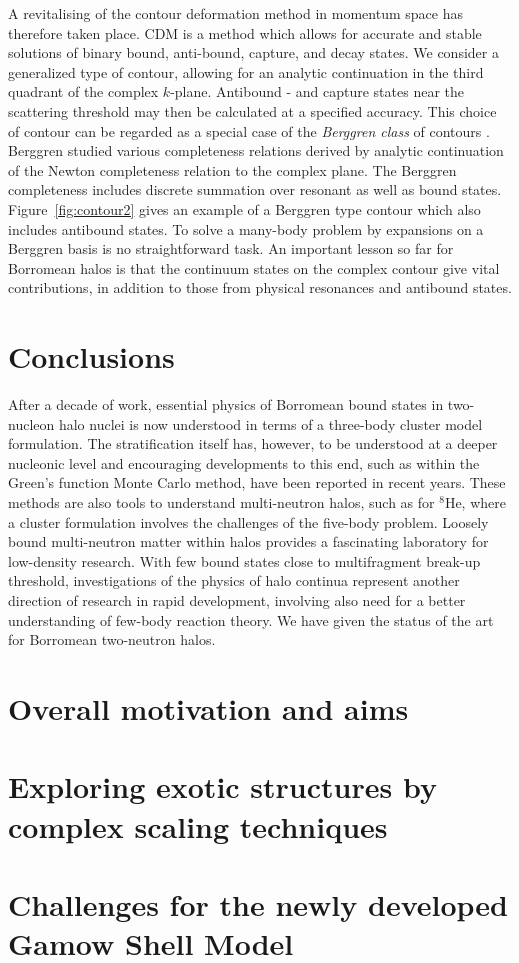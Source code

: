 A revitalising of the contour deformation method in momentum space
has therefore taken place. CDM is a method which allows for
accurate and stable solutions of binary bound, anti-bound,
capture, and decay states. We consider a generalized type of
contour, allowing for an analytic continuation in the third
quadrant of the complex $k$-plane. Antibound - and capture states
near the scattering threshold may then be calculated at a
specified accuracy.  This choice of contour can be regarded as a
special case of the \emph{Berggren class} of contours
\cite{berggren}. Berggren studied various completeness relations
derived by analytic continuation of the Newton completeness
relation to the complex plane. The Berggren completeness includes
discrete summation over resonant as well as bound states.
Figure~\ref{fig:contour2} gives an example of a Berggren type
contour which also includes antibound states. To solve a many-body
problem by expansions on a Berggren basis is no straightforward
task. An important lesson so far for Borromean halos is that the
continuum states on the complex contour give vital contributions,
in addition to those from physical resonances and antibound
states.

\section{Conclusions}

After a decade of work, essential physics of Borromean bound
states in two-nucleon halo nuclei is now understood in terms of a
three-body cluster model formulation. The stratification itself
has, however, to be understood at a deeper nucleonic level and
encouraging developments to this end, such as within the Green's
function Monte Carlo method, have been reported in recent years.
These methods are also tools to understand multi-neutron halos,
such as for $^8$He, where a cluster formulation involves the
challenges of the five-body problem. Loosely bound multi-neutron
matter within halos provides a fascinating laboratory for
low-density research. With few bound states close to multifragment
break-up threshold, investigations of the physics of halo continua
represent another direction of research in rapid development,
involving also need for a better understanding of few-body
reaction theory. We have given the status of the art for Borromean
two-neutron halos.

\section{Overall motivation and aims}
\label{sec:motivation}

\section{Exploring exotic structures by complex scaling techniques}
\label{sec:exploring_exotic}

\section{Challenges for the newly developed Gamow Shell Model}
\label{sec:challenges}


